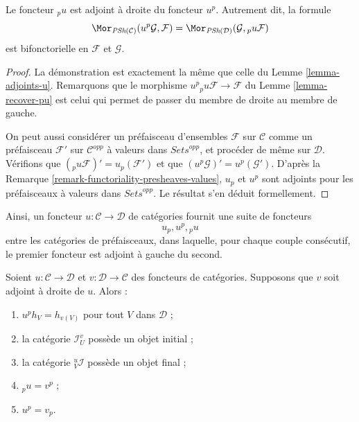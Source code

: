 \begin{lemma}
\label{lemma-adjoints-pu}
Le foncteur ${}_pu$ est adjoint à droite du foncteur $u^p$.
Autrement dit, la formule
$$
\Mor_{\textit{PSh}(\mathcal{C})}(u^p\mathcal{G}, \mathcal{F})
=
\Mor_{\textit{PSh}(\mathcal{D})}(\mathcal{G}, {}_pu\mathcal{F})
$$
est bifonctorielle en $\mathcal{F}$ et $\mathcal{G}$.
\end{lemma}

\begin{proof}
La démonstration est exactement la même que celle du
Lemme \ref{lemma-adjoints-u}. Remarquons que le morphisme
$u^p{}_pu \mathcal{F} \to \mathcal{F}$ du
Lemme \ref{lemma-recover-pu} est celui qui permet de passer
du membre de droite au membre de gauche.

\medskip\noindent
On peut aussi considérer un préfaisceau d’ensembles $\mathcal{F}$ sur
$\mathcal{C}$ comme un préfaisceau $\mathcal{F}'$ sur
$\mathcal{C}^{opp}$ à valeurs dans $\textit{Sets}^{opp}$,
et procéder de même sur $\mathcal{D}$.
Vérifions que $({}_pu \mathcal{F})' = u_p(\mathcal{F}')$ et que
$(u^p\mathcal{G})' = u^p(\mathcal{G}')$.
D’après la Remarque \ref{remark-functoriality-presheaves-values},
$u_p$ et $u^p$ sont adjoints pour les préfaisceaux à valeurs dans
$\textit{Sets}^{opp}$. Le résultat s’en déduit formellement.
\end{proof}

\noindent
Ainsi, un foncteur $u : \mathcal{C} \to \mathcal{D}$ de catégories
fournit une suite de foncteurs
$$
u_p, u^p, {}_pu
$$
entre les catégories de préfaisceaux, dans laquelle, pour chaque couple
consécutif, le premier foncteur est adjoint à gauche du second.

\begin{lemma}
\label{lemma-adjoint-functors}
Soient $u : \mathcal{C} \to \mathcal{D}$ et
$v : \mathcal{D} \to \mathcal{C}$ des foncteurs de catégories.
Supposons que $v$ soit adjoint à droite de $u$. Alors :
\begin{enumerate}
\item $u^ph_V = h_{v(V)}$ pour tout $V$ dans $\mathcal{D}$ ;
\item la catégorie $\mathcal{I}^v_U$ possède un objet initial ;
\item la catégorie ${}_V^u\mathcal{I}$ possède un objet final ;
\item ${}_pu = v^p$ ;
\item $u^p = v_p$.
\end{enumerate}
\end{lemma}

